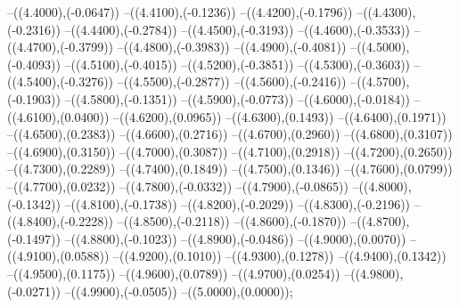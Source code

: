 {	--({\sx*(4.4000)},{\sy*(-0.0647)})
	--({\sx*(4.4100)},{\sy*(-0.1236)})
	--({\sx*(4.4200)},{\sy*(-0.1796)})
	--({\sx*(4.4300)},{\sy*(-0.2316)})
	--({\sx*(4.4400)},{\sy*(-0.2784)})
	--({\sx*(4.4500)},{\sy*(-0.3193)})
	--({\sx*(4.4600)},{\sy*(-0.3533)})
	--({\sx*(4.4700)},{\sy*(-0.3799)})
	--({\sx*(4.4800)},{\sy*(-0.3983)})
	--({\sx*(4.4900)},{\sy*(-0.4081)})
	--({\sx*(4.5000)},{\sy*(-0.4093)})
	--({\sx*(4.5100)},{\sy*(-0.4015)})
	--({\sx*(4.5200)},{\sy*(-0.3851)})
	--({\sx*(4.5300)},{\sy*(-0.3603)})
	--({\sx*(4.5400)},{\sy*(-0.3276)})
	--({\sx*(4.5500)},{\sy*(-0.2877)})
	--({\sx*(4.5600)},{\sy*(-0.2416)})
	--({\sx*(4.5700)},{\sy*(-0.1903)})
	--({\sx*(4.5800)},{\sy*(-0.1351)})
	--({\sx*(4.5900)},{\sy*(-0.0773)})
	--({\sx*(4.6000)},{\sy*(-0.0184)})
	--({\sx*(4.6100)},{\sy*(0.0400)})
	--({\sx*(4.6200)},{\sy*(0.0965)})
	--({\sx*(4.6300)},{\sy*(0.1493)})
	--({\sx*(4.6400)},{\sy*(0.1971)})
	--({\sx*(4.6500)},{\sy*(0.2383)})
	--({\sx*(4.6600)},{\sy*(0.2716)})
	--({\sx*(4.6700)},{\sy*(0.2960)})
	--({\sx*(4.6800)},{\sy*(0.3107)})
	--({\sx*(4.6900)},{\sy*(0.3150)})
	--({\sx*(4.7000)},{\sy*(0.3087)})
	--({\sx*(4.7100)},{\sy*(0.2918)})
	--({\sx*(4.7200)},{\sy*(0.2650)})
	--({\sx*(4.7300)},{\sy*(0.2289)})
	--({\sx*(4.7400)},{\sy*(0.1849)})
	--({\sx*(4.7500)},{\sy*(0.1346)})
	--({\sx*(4.7600)},{\sy*(0.0799)})
	--({\sx*(4.7700)},{\sy*(0.0232)})
	--({\sx*(4.7800)},{\sy*(-0.0332)})
	--({\sx*(4.7900)},{\sy*(-0.0865)})
	--({\sx*(4.8000)},{\sy*(-0.1342)})
	--({\sx*(4.8100)},{\sy*(-0.1738)})
	--({\sx*(4.8200)},{\sy*(-0.2029)})
	--({\sx*(4.8300)},{\sy*(-0.2196)})
	--({\sx*(4.8400)},{\sy*(-0.2228)})
	--({\sx*(4.8500)},{\sy*(-0.2118)})
	--({\sx*(4.8600)},{\sy*(-0.1870)})
	--({\sx*(4.8700)},{\sy*(-0.1497)})
	--({\sx*(4.8800)},{\sy*(-0.1023)})
	--({\sx*(4.8900)},{\sy*(-0.0486)})
	--({\sx*(4.9000)},{\sy*(0.0070)})
	--({\sx*(4.9100)},{\sy*(0.0588)})
	--({\sx*(4.9200)},{\sy*(0.1010)})
	--({\sx*(4.9300)},{\sy*(0.1278)})
	--({\sx*(4.9400)},{\sy*(0.1342)})
	--({\sx*(4.9500)},{\sy*(0.1175)})
	--({\sx*(4.9600)},{\sy*(0.0789)})
	--({\sx*(4.9700)},{\sy*(0.0254)})
	--({\sx*(4.9800)},{\sy*(-0.0271)})
	--({\sx*(4.9900)},{\sy*(-0.0505)})
	--({\sx*(5.0000)},{\sy*(0.0000)});
}

